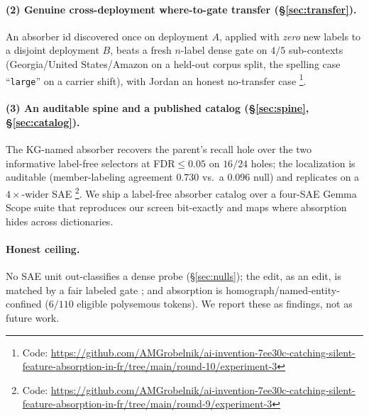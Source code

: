 \documentclass[11pt,letterpaper]{article}
\begin{document}
\paragraph{(2) Genuine cross-deployment where-to-gate transfer (\S\ref{sec:transfer}).} An absorber id discovered once on deployment $A$, applied with \emph{zero} new labels to a disjoint deployment $B$, beats a fresh $n$-label dense gate on $4/5$ sub-contexts (Georgia/United States/Amazon on a held-out corpus split, the spelling case ``\texttt{large}'' on a carrier shift), with Jordan an honest no-transfer case \footnote{Code: \url{https://github.com/AMGrobelnik/ai-invention-7ee30c-catching-silent-feature-absorption-in-fr/tree/main/round-10/experiment-3}}.

\paragraph{(3) An auditable spine and a published catalog (\S\ref{sec:spine}, \S\ref{sec:catalog}).} The KG-named absorber recovers the parent's recall hole over the two informative label-free selectors at FDR$\le0.05$ on $16/24$ holes; the localization is auditable (member-labeling agreement $0.730$ vs.\ a $0.096$ null) and replicates on a $4\times$-wider SAE \footnote{Code: \url{https://github.com/AMGrobelnik/ai-invention-7ee30c-catching-silent-feature-absorption-in-fr/tree/main/round-9/experiment-3}}. We ship a label-free absorber catalog over a four-SAE Gemma Scope suite that reproduces our screen bit-exactly and maps where absorption hides across dictionaries.

\paragraph{Honest ceiling.} No SAE unit out-classifies a dense probe (\S\ref{sec:nulls}); the edit, as an edit, is matched by a fair labeled gate \citep{Lee2024, Zhang2026}; and absorption is homograph/named-entity-confined ($6/110$ eligible polysemous tokens). We report these as findings, not as future work.
\end{document}
